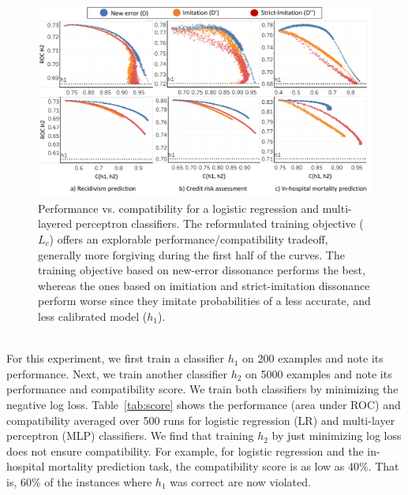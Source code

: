 \documentclass[letterpaper]{article} %
\newcommand{\bug}
    {\mbox{\rule{2mm}{2mm}}}
\newcommand{\Bug}[1]
    {\bug \footnote{BUG: {#1}}}
\newcommand{\?}{\mbox{?}}
\newcommand{\hone}{\mbox{$h_1$}}
\newcommand{\htwo}{\mbox{$h_2$}}
\newcommand{\loss}{L}
\newcommand{\lossbc}{\loss_c}
\begin{document}
\begin{figure}[t]
    \centering
    \includegraphics[width=0.9\linewidth]{figure5.pdf}
    \caption{Performance vs. compatibility for a logistic regression and multi-layered perceptron classifiers. The reformulated training objective ($\lossbc$) offers an explorable performance/compatibility tradeoff, generally more forgiving during the first half of the curves. The training objective based on new-error dissonance performs the best, whereas the ones based on imitiation and strict-imitation dissonance perform worse since they imitate probabilities of a less accurate, and less calibrated model ($\hone$).}
    \label{fig:diss}
\end{figure}
\\
\noindent For this experiment, we first train a classifier $\hone$ on 200 examples and note its performance. Next, we train another classifier $\htwo$ on 5000 examples
and note its performance and compatibility score. We train both classifiers by minimizing the negative log loss. Table~\ref{tab:score} shows the performance (area under ROC) and compatibility averaged over 500 runs for logistic regression (LR) and multi-layer perceptron (MLP) classifiers. We find that training $\htwo$ by just minimizing log loss does not ensure compatibility. For example, for logistic regression and the in-hospital mortality prediction task, the compatibility score is as low as 40\%.  That is, 60\% of the instances where $h_1$ was correct are now violated.\\
\end{document}
